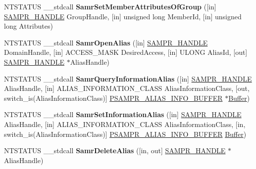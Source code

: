 \begin{DoxyCompactItemize}
N\+T\+S\+T\+A\+T\+US \+\_\+\+\_\+stdcall {\bfseries Samr\+Set\+Member\+Attributes\+Of\+Group} (\mbox{[}in\mbox{]} \hyperlink{interfacevoid}{S\+A\+M\+P\+R\+\_\+\+H\+A\+N\+D\+LE} Group\+Handle, \mbox{[}in\mbox{]} unsigned long Member\+Id, \mbox{[}in\mbox{]} unsigned long Attributes)
\item 
\mbox{\label{interfacesamr_a0c2596ef52e3f3cd459d3c7c16f94f9a}} 
N\+T\+S\+T\+A\+T\+US \+\_\+\+\_\+stdcall {\bfseries Samr\+Open\+Alias} (\mbox{[}in\mbox{]} \hyperlink{interfacevoid}{S\+A\+M\+P\+R\+\_\+\+H\+A\+N\+D\+LE} Domain\+Handle, \mbox{[}in\mbox{]} A\+C\+C\+E\+S\+S\+\_\+\+M\+A\+SK Desired\+Access, \mbox{[}in\mbox{]} U\+L\+O\+NG Alias\+Id, \mbox{[}out\mbox{]} \hyperlink{interfacevoid}{S\+A\+M\+P\+R\+\_\+\+H\+A\+N\+D\+LE} $\ast$Alias\+Handle)
\item 
\mbox{\label{interfacesamr_a83b4928dab3907b6a6b6b8d31978e5f7}} 
N\+T\+S\+T\+A\+T\+US \+\_\+\+\_\+stdcall {\bfseries Samr\+Query\+Information\+Alias} (\mbox{[}in\mbox{]} \hyperlink{interfacevoid}{S\+A\+M\+P\+R\+\_\+\+H\+A\+N\+D\+LE} Alias\+Handle, \mbox{[}in\mbox{]} A\+L\+I\+A\+S\+\_\+\+I\+N\+F\+O\+R\+M\+A\+T\+I\+O\+N\+\_\+\+C\+L\+A\+SS Alias\+Information\+Class, \mbox{[}out, switch\+\_\+is(Alias\+Information\+Class)\mbox{]} \hyperlink{union___s_a_m_p_r___a_l_i_a_s___i_n_f_o___b_u_f_f_e_r}{P\+S\+A\+M\+P\+R\+\_\+\+A\+L\+I\+A\+S\+\_\+\+I\+N\+F\+O\+\_\+\+B\+U\+F\+F\+ER} $\ast$\hyperlink{class_buffer}{Buffer})
\item 
\mbox{\label{interfacesamr_ab3e0a5708d65cdf562936325ed0d3565}} 
N\+T\+S\+T\+A\+T\+US \+\_\+\+\_\+stdcall {\bfseries Samr\+Set\+Information\+Alias} (\mbox{[}in\mbox{]} \hyperlink{interfacevoid}{S\+A\+M\+P\+R\+\_\+\+H\+A\+N\+D\+LE} Alias\+Handle, \mbox{[}in\mbox{]} A\+L\+I\+A\+S\+\_\+\+I\+N\+F\+O\+R\+M\+A\+T\+I\+O\+N\+\_\+\+C\+L\+A\+SS Alias\+Information\+Class, \mbox{[}in, switch\+\_\+is(Alias\+Information\+Class)\mbox{]} \hyperlink{union___s_a_m_p_r___a_l_i_a_s___i_n_f_o___b_u_f_f_e_r}{P\+S\+A\+M\+P\+R\+\_\+\+A\+L\+I\+A\+S\+\_\+\+I\+N\+F\+O\+\_\+\+B\+U\+F\+F\+ER} \hyperlink{class_buffer}{Buffer})
\item 
\mbox{\label{interfacesamr_ac883617e183071fcc00cfe05faa29d27}} 
N\+T\+S\+T\+A\+T\+US \+\_\+\+\_\+stdcall {\bfseries Samr\+Delete\+Alias} (\mbox{[}in, out\mbox{]} \hyperlink{interfacevoid}{S\+A\+M\+P\+R\+\_\+\+H\+A\+N\+D\+LE} $\ast$Alias\+Handle)

\end{DoxyCompactItemize}
